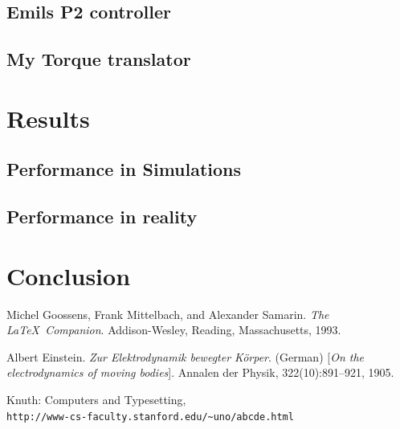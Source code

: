 \documentclass{article}
\begin{document}
\subsection{Emils P2 controller}
\subsection{My Torque translator}


\section{Results}
\subsection{Performance in Simulations}
\subsection{Performance in reality}

\section{Conclusion}

\begin{thebibliography}{9}
Michel Goossens, Frank Mittelbach, and Alexander Samarin. 
\textit{The \LaTeX\ Companion}. 
Addison-Wesley, Reading, Massachusetts, 1993.
 
Albert Einstein. 
\textit{Zur Elektrodynamik bewegter K{\"o}rper}. (German) 
[\textit{On the electrodynamics of moving bodies}]. 
Annalen der Physik, 322(10):891–921, 1905.
 
Knuth: Computers and Typesetting,
\\\texttt{http://www-cs-faculty.stanford.edu/\~{}uno/abcde.html}
\end{thebibliography}
\end{document}
